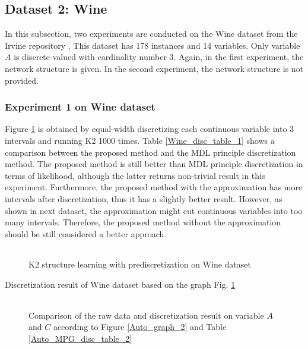 \subsection{Dataset 2: Wine}
\label{subsec:wine}

In this subsection, two experiments are conducted on the Wine dataset from the Irvine repository \citep{Lichman:2013}. This dataset has 178 instances and 14 variables. Only variable $A$ is discrete-valued with cardinality number 3. Again, in the first experiment, the network structure is given. In the second experiment, the network structure is not provided.

\subsubsection{Experiment 1 on Wine dataset}
\label{subsubsec:wine_exp2}

Figure \ref{Wine_graph_1} is obtained by equal-width discretizing each continuous variable into 3 intervals and running K2 1000 times. Table \ref{Wine_disc_table_1} shows a comparison between the proposed method and the MDL principle discretization method. The proposed method is still better than MDL principle discretization in terms of likelihood, although the latter returns non-trivial result in this experiment. Furthermore, the proposed method with the approximation has more intervals after discretization, thus it has a slightly better result. However, as shown in next dataset, the approximation might cut continuous variables into too many intervals. Therefore, the proposed method without the approximation should be still considered a better approach.


\begin{figure}[ht]
    \begin{tabular}{cc}
      
    \end{tabular}
  \caption{K2 structure learning with prediscretization on Wine dataset}
  \label{Wine_graph_1}
\end{figure}

\begin{table}
\centering
\scalebox{1.0}{

}
\caption{Discretization result of Wine dataset based on the graph Fig. \ref{Wine_graph_1}}
\label{Wine_disc_table_1}
\end{table}

\begin{figure}[ht]
    \begin{tabular}{cc}
      
    \end{tabular}
  \caption{Comparison of the raw data and discretization result on variable $A$ and $C$ according to Figure \ref{Auto_graph_2} and Table \ref{Auto_MPG_disc_table_2}}
  \label{wine_exp1_distr}
\end{figure}


